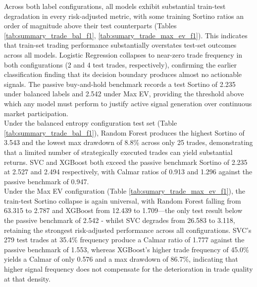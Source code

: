 \noindent Across both label configurations, all models exhibit substantial train-test degradation in every risk-adjusted metric, with some training Sortino ratios an order of magnitude above their test counterparts (Tables \ref{tab:summary_trade_bal_f1}, \ref{tab:sumary_trade_max_ev_f1}). This indicates that train-set trading performance substantially overstates test-set outcomes across all models. Logistic Regression collapses to near-zero trade frequency in both configurations (2 and 4 test trades, respectively), confirming the earlier classification finding that its decision boundary produces almost no actionable signals. The passive buy-and-hold benchmark records a test Sortino of 2.235 under balanced labels and 2.542 under Max EV, providing the threshold above which any model must perform to justify active signal generation over continuous market participation.\\
Under the balanced entropy configuration test set (Table \ref{tab:summary_trade_bal_f1}), Random Forest produces the highest Sortino of 3.543 and the lowest max drawdown of 8.8\% across only 25 trades, demonstrating that a limited number of strategically executed trades can yield substantial returns. SVC and XGBoost both exceed the passive benchmark Sortino of 2.235 at 2.527 and 2.494 respectively, with Calmar ratios of 0.913 and 1.296 against the passive benchmark of 0.947.\\
Under the Max EV configuration (Table \ref{tab:sumary_trade_max_ev_f1}), the train-test Sortino collapse is again universal, with Random Forest falling from 63.315 to 2.787 and XGBoost from 12.439 to 1.709—the only test result below the passive benchmark of 2.542 - whilst SVC degrades from 26.583 to 3.118, retaining the strongest risk-adjusted performance across all configurations. SVC's 279 test trades at 35.4\% frequency produce a Calmar ratio of 1.777 against the passive benchmark of 1.553, whereas XGBoost's higher trade frequency of 45.0\% yields a Calmar of only 0.576 and a max drawdown of 86.7\%, indicating that higher signal frequency does not compensate for the deterioration in trade quality at that density.